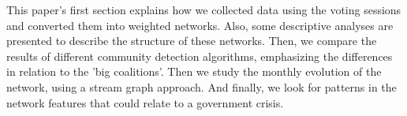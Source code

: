 This paper's first section explains how we collected data using the voting sessions and converted them into weighted networks. Also, some descriptive analyses are presented to describe the structure of these networks. Then, we compare the results of different community detection algorithms, emphasizing the differences in relation to the 'big coalitions'. 
Then we study the monthly evolution of the network, using a stream graph approach. And finally, we look for patterns in the network features that could relate to a government crisis.\\
